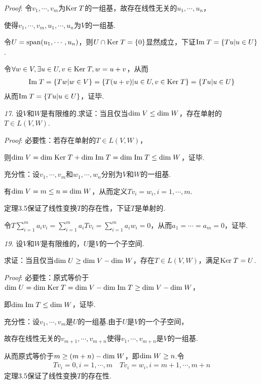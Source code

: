 \textit{Proof}:
令\(v_1,\cdots,v_m\)为\(\mathrm{Ker \;} T\)的一组基，故存在线性无关的\(u_1,\cdots,u_n\)，

使得\(v_1,\cdots,v_m,u_1,\cdots,u_n\)为\(V\)的一组基.

令\(U=\mathrm{span} (u_1,\cdots,u_n)\)，则\(U\cap \mathrm{Ker \;} T=\{0\}\)显然成立，下证\(\mathrm{Im \;} T=\{Tu|u\in U\}\).

令\(\forall w\in V,\exists u\in U,v\in \mathrm{Ker \;} T, w=u+v\)，从而
    \begin{align*}
        \mathrm{Im \;} T=\{Tw|w\in V\}=\{T(u+v)|u\in U,v\in \mathrm{Ker \;} T\}=\{Tu|u\in U\}
    \end{align*}
从而\(\mathrm{Im \;} T=\{Tu|u\in U\}\)，证毕.

\newpage

\textit{17.}
设\(V\)和\(W\)是有限维的.求证：当且仅当\(\mathrm{dim \;} V\leq \mathrm{dim \;} W\)，存在单射的\(T\in L(V,W)\).

\textit{Proof}:
必要性：若存在单射的\(T\in L(V,W)\)，

则\(\mathrm{dim \;} V=\mathrm{dim \;} \mathrm{Ker \;} T+\mathrm{dim \;} \mathrm{Im \;} T=\mathrm{dim \;} \mathrm{Im \;} T \leq \mathrm{dim \;} W\)，证毕.

充分性：设\(v_1,\cdots,v_m\)和\(w_1,\cdots,w_n\)分别为\(V\)和\(W\)的一组基.

有\(\mathrm{dim \;} V=m\leq n=\mathrm{dim \;} W\)，从而定义\(Tv_i=w_i,i=1,\cdots,m\).

定理3.5保证了线性变换\(T\)的存在性，下证\(T\)是单射的.

令\(T\sum_{i=1}^m a_iv_i=\sum_{i=1}^m a_iTv_i=\sum_{i=1}^m a_iw_i=0\)，从而\(a_1=\cdots=a_m=0\)，证毕.

\hspace*{\fill}

\textit{19.}
设\(V\)和\(W\)是有限维的，\(U\)是\(V\)的一个子空间.

求证：当且仅当\(\mathrm{dim \;} U \geq \mathrm{dim \;} V-\mathrm{dim \;} W\)，存在\(T\in L(V,W)\)，满足\(\mathrm{Ker \;} T=U\).

\textit{Proof}:
必要性：原式等价于\(\mathrm{dim \;} U=\mathrm{dim \;} \mathrm{Ker \;} T=\mathrm{dim \;} V-\mathrm{dim \;} \mathrm{Im \;} T \geq \mathrm{dim \;} V-\mathrm{dim \;} W\)，

即\(\mathrm{dim \;} \mathrm{Im \;} T \leq \mathrm{dim \;} W\)，证毕.

充分性：设\(v_1,\cdots,v_m\)是\(U\)的一组基.由于\(U\)是\(V\)的一个子空间，

故存在线性无关的\(v_{m+1},\cdots,v_{m+n}\)使得\(v_1,\cdots,v_{m+n}\)是\(V\)的一组基.

从而原式等价于\(m\geq (m+n)-\mathrm{dim \;} W\)，即\(\mathrm{dim \;} W\geq n\).令
    \begin{align*}
        Tv_i=0,i=1,\cdots,m \quad Tv_i=w_i,i=m+1,\cdots,m+n
    \end{align*}
定理3.5保证了线性变换\(T\)的存在性.

